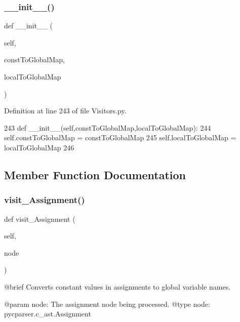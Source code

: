 \subsubsection{\texorpdfstring{\+\_\+\+\_\+init\+\_\+\+\_\+()}{\_\_init\_\_()}}
{\footnotesize\ttfamily def \+\_\+\+\_\+init\+\_\+\+\_\+ (\begin{DoxyParamCaption}\item[{}]{self,  }\item[{}]{const\+To\+Global\+Map,  }\item[{}]{local\+To\+Global\+Map }\end{DoxyParamCaption})}



Definition at line 243 of file Visitors.\+py.


\begin{DoxyCode}
243     \textcolor{keyword}{def }\_\_init\_\_(self,constToGlobalMap,localToGlobalMap):
244         self.constToGlobalMap = constToGlobalMap
245         self.localToGlobalMap = localToGlobalMap
246 
\end{DoxyCode}


\subsection{Member Function Documentation}
\mbox{\label{classVisitors_1_1ConstantMerger_adae6ad6f5b94c4acd95924bb3df9ebc8}} 
\subsubsection{\texorpdfstring{visit\+\_\+\+Assignment()}{visit\_Assignment()}}
{\footnotesize\ttfamily def visit\+\_\+\+Assignment (\begin{DoxyParamCaption}\item[{}]{self,  }\item[{}]{node }\end{DoxyParamCaption})}

\begin{DoxyVerb}@brief Converts constant values in assignments to global variable names.

@param node: The assignment node being processed.
@type node: pycparser.c_ast.Assignment
\end{DoxyVerb}
 

